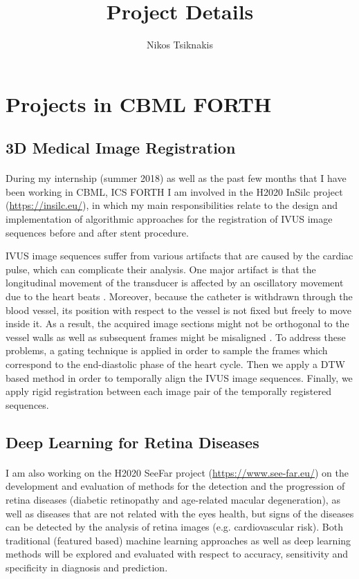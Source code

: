 \documentclass{article}
\begin{document}
\title{Project Details}
\author{Nikos Tsiknakis}

\maketitle

\section{Projects in CBML FORTH}

\subsection{3D Medical Image Registration}
\paragraph{}
During my internship (summer 2018) as well as the past few months that I have been working in CBML, ICS FORTH I am involved in the H2020 InSilc project (\url{https://insilc.eu/}), in which my main responsibilities relate to the design and implementation of algorithmic approaches for the registration of IVUS image sequences before and after stent procedure.

IVUS image sequences suffer from various artifacts that are caused by the cardiac pulse, which can complicate their analysis. One major artifact is that the longitudinal movement of the transducer is affected by an oscillatory movement due to the heart beats \cite{alberti2012automatic}. Moreover, because the catheter is withdrawn through the blood vessel, its position with respect to the vessel is not fixed but freely to move inside it. As a result, the acquired image sections might not be orthogonal to the vessel walls \cite{gatta2008robust} as well as subsequent frames might be misaligned \cite{alberti2012automatic}. To address these problems, a gating technique is applied in order to sample the frames which correspond to the end-diastolic phase of the heart cycle. Then we apply a DTW based method in order to temporally align the IVUS image sequences. Finally, we apply rigid registration between each image pair of the temporally registered sequences.


\subsection{Deep Learning for Retina Diseases}
\paragraph{}
I am also working on the H2020 SeeFar project (\url{https://www.see-far.eu/}) on the development and evaluation of methods for the detection and the progression of retina diseases (diabetic retinopathy and  age-related macular degeneration), as well as diseases that are not related with the eyes health, but signs of the diseases can be detected by the analysis of retina images (e.g. cardiovascular risk). Both traditional (featured based) machine learning approaches as well as deep learning methods will be explored and evaluated  with respect to accuracy, sensitivity and specificity in diagnosis and prediction.
\end{document}
